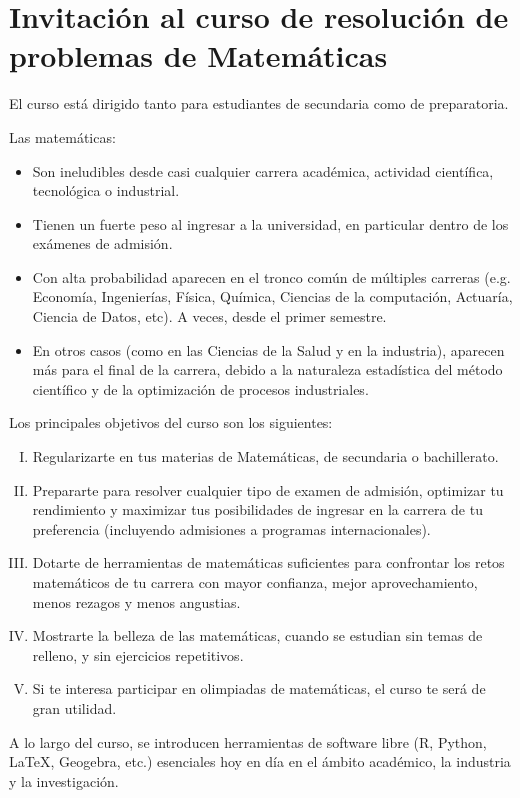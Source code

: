 \chapter*{Invitación al curso de resolución de problemas de Matemáticas}

El curso está dirigido tanto para estudiantes de secundaria como de preparatoria.

Las matemáticas: 
\begin{itemize}
    \item Son ineludibles desde casi cualquier carrera académica, actividad científica, tecnológica o industrial.
    \item Tienen un fuerte peso al ingresar a la universidad, en particular dentro de los exámenes de admisión.
    \item Con alta probabilidad aparecen en el tronco común de múltiples carreras (e.g. Economía, Ingenierías, Física, Química, Ciencias de la computación, Actuaría, Ciencia de Datos, etc). A veces, desde el primer semestre.
    \item En otros casos (como en las Ciencias de la Salud y en la industria), aparecen más para el final de la carrera, debido a la naturaleza estadística del método científico y de la optimización de procesos industriales.
\end{itemize}

Los principales objetivos del curso son los siguientes:
\begin{enumerate}[I.]
    \item Regularizarte en tus materias de Matemáticas, de secundaria o bachillerato.
    \item Prepararte para resolver cualquier tipo de examen de admisión, optimizar tu rendimiento y maximizar tus posibilidades de ingresar en la carrera de tu preferencia (incluyendo admisiones a programas internacionales).
   \item Dotarte de herramientas de matemáticas suficientes para confrontar los retos matemáticos de tu carrera con mayor confianza, mejor aprovechamiento, menos rezagos y menos angustias.
   \item Mostrarte la belleza de las matemáticas, cuando se estudian sin temas de relleno, y sin ejercicios repetitivos.
   \item Si te interesa participar en olimpiadas de matemáticas, el curso te será de gran utilidad.
\end{enumerate}
 
A lo largo del curso, se introducen herramientas de software libre (R, Python, LaTeX, Geogebra, etc.) esenciales hoy en día en el ámbito académico, la industria y la investigación.

